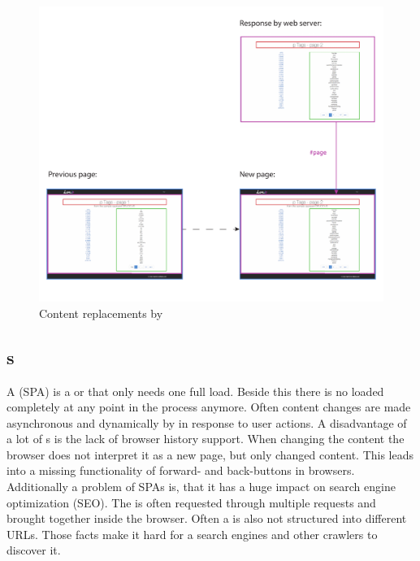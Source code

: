 \begin{figure}[H]
\centering
\includegraphics[width=12cm]{images/ajax_replacements.pdf}
\caption[ajax_replacements]{Content replacements by \ajax{}}
\label{fig:ajax_replacements}
\end{figure}

\subsection{\SinglePageApplication{}s\label{singlePageApplication}}
A \singlePageApplication{} (SPA) is a \webApplication{} or \webSite{} that only needs one full \webPage{} load.
Beside this there is no \webPage{} loaded completely at any point in the process anymore.
Often content changes are made asynchronous and dynamically by \ajax{} in response to user actions.
A disadvantage of a lot of \singlePageApplication{}s is the lack of browser history support.
When changing the content the browser does not interpret it as a new page, but only changed content.
This leads into a missing functionality of forward- and back-buttons in browsers.
\\
Additionally a problem of SPAs is, that it has a huge impact on search engine optimization (SEO).
The \webPage{} is often requested through multiple requests and brought together inside the browser. Often a \webSite{} is also not structured into different URLs.
Those facts make it hard for a search engines and other crawlers to discover it.

